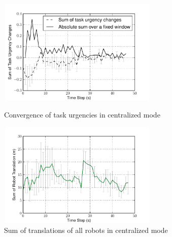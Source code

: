 \documentclass[letterpaper, 10 pt, times, conference]{ieeeconf} %
\begin{document}
\begin{figure}
\begin{minipage}[t]{0.5\linewidth}
\centering
\includegraphics[height=5cm,width=3in]{images/global/TaskUrgencyConvergence-step2-th-p1}
\caption{\small Convergence of task urgencies in centralized mode}
\label{fig:urgency-convergence} %
\end{minipage}
\hspace{0.5cm}
\begin{minipage}[t]{0.5\linewidth}
\centering
\includegraphics[height=5cm,width=3in]{images/global/DeltaTranslationStat}
\caption{\small Sum of translations of all robots in centralized  mode }
\label{fig:translation-stat} %
\end{minipage}
\end{figure}
\end{document}
